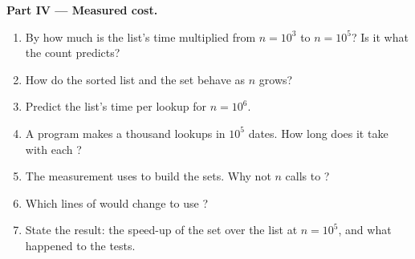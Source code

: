 \begin{problem}
\medskip\noindent\textbf{Part IV --- Measured cost.}
\begin{enumerate}[resume]
  \item By how much is the list's time multiplied from $n = 10^3$ to $n = 10^5$? Is it what the count predicts?
  \item How do the sorted list and the set behave as $n$ grows?
  \item Predict the list's time per lookup for $n = 10^6$.
  \item A program makes a thousand lookups in $10^5$ dates. How long does it take with each ?
  \item The measurement uses  to build the sets. Why not $n$ calls to ?
  \item Which lines of  would change to use ?
  \item State the result: the speed-up of the set over the list at $n = 10^5$, and what happened to the tests.
\end{enumerate}
\end{problem}
